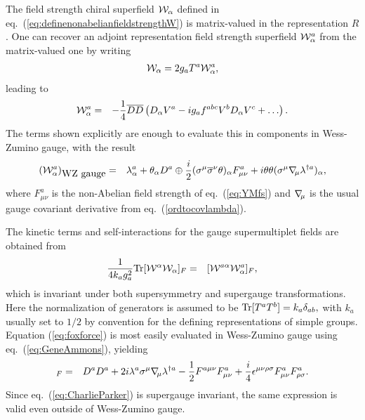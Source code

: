 \documentclass[12pt]{article}
\def\BDminus{-}
\def\BDminus{+}
\def\BDminus{\ominus}
\def\BDminus{\oplus}
\newcommand{\nablasubmu}{\nabla\hspace{-2pt}{}_\mu}
\def\beq{\begin{eqnarray}}
\def\eeq{\end{eqnarray}}
\def\sigmabar{\overline\sigma}
\def\Dcon{\overline D}
\begin{document}
The field strength chiral superfield ${\cal W}_\alpha$ defined in 
eq.~(\ref{eq:definenonabelianfieldstrengthW}) 
is matrix-valued in the representation $R$. One can recover an adjoint representation
field strength superfield ${\cal W}^a_\alpha$ from the matrix-valued
one by writing
\beq
{\cal W}_\alpha = 2 g_a T^a {\cal W}^a_\alpha ,
\eeq
leading to
\beq
{\cal W}^a_\alpha &=& 
-\frac{1}{4} \Dcon\Dcon \left (
D_\alpha V^a - i g_a f^{abc} V^b D_\alpha V^c + \ldots \right ) .
\eeq
The terms shown explicitly are enough to evaluate this in components in 
Wess-Zumino gauge, with the result
\beq
({\cal W}^a_\alpha)_{\mbox{WZ gauge}}
&=&
\lambda^a_\alpha + \theta_\alpha D^a 
\BDminus \frac{i}{2} (\sigma^\mu 
\sigmabar^\nu \theta)_\alpha F^a_{\mu\nu} 
+ i \theta\theta (\sigma^\mu \nablasubmu \lambda^{\dagger a})_\alpha
,
\label{eq:GeneAmmons}
\eeq
where $F^a_{\mu\nu}$ is the non-Abelian field strength of eq.~(\ref{eq:YMfs})
and $\nablasubmu$ is the usual gauge covariant derivative from eq.~(\ref{ordtocovlambda}).

The kinetic terms and self-interactions for the gauge supermultiplet fields are obtained
from 
\beq
\frac{1}{4 k_a g_a^2} {\rm Tr}[{\cal W}^{\alpha} {\cal W}_\alpha]_F &=&
[{\cal W}^{a\alpha} {\cal W}^a_\alpha]_F,
\label{eq:foxforce}
\eeq
which is invariant under both supersymmetry and supergauge transformations.
Here the normalization of generators is assumed to be
$
{\rm Tr}[T^a T^b] = k_a \delta_{ab},
$
with $k_a$ usually set to $1/2$ by convention for the 
defining representations of simple groups.
Equation (\ref{eq:foxforce}) is most easily
evaluated in Wess-Zumino gauge using eq.~(\ref{eq:GeneAmmons}), yielding
\beq
[{\cal W}^{a\alpha} {\cal W}^a_\alpha]_F &=& D^{a}D^a +
2 i \lambda^a \sigma^\mu \nablasubmu \lambda^{\dagger a}
-\frac{1}{2} F^{a\mu\nu} F^a_{\mu\nu} 
+ \frac{i}{4} \epsilon^{\mu\nu\rho\sigma} F^a_{\mu\nu} F^a_{\rho\sigma} .
\label{eq:CharlieParker}
\eeq 
Since eq.~(\ref{eq:CharlieParker}) is supergauge invariant, the same expression is valid 
even outside of Wess-Zumino gauge.
\end{document}
